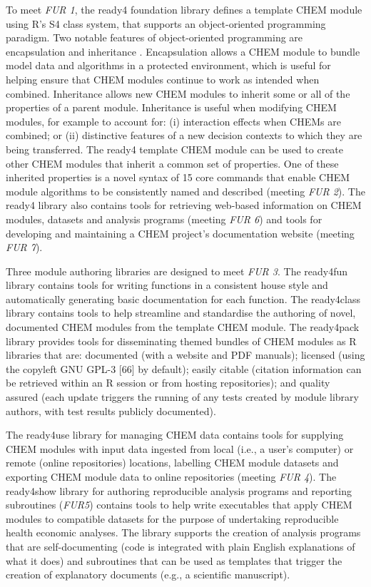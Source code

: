 \documentclass[sn-vancouver,Numbered,pdflatex]{sn-jnl}
\theoremstyle{remark}
\theoremstyle{definition}
\begin{document}
To meet \emph{FUR 1}, the ready4 \citep{ready4lib24} foundation library defines a template CHEM module using R's S4 class system, that supports an object-oriented programming paradigm. Two notable features of object-oriented programming are encapsulation \citep{8717448} and inheritance \citep{8717448}. Encapsulation allows a CHEM module to bundle model data and algorithms in a protected environment, which is useful for helping ensure that CHEM modules continue to work as intended when combined. Inheritance allows new CHEM modules to inherit some or all of the properties of a parent module. Inheritance is useful when modifying CHEM modules, for example to account for: (i) interaction effects when CHEMs are combined; or (ii) distinctive features of a new decision contexts to which they are being transferred. The ready4 template CHEM module can be used to create other CHEM modules that inherit a common set of properties. One of these inherited properties is a novel syntax of 15 core commands that enable CHEM module algorithms to be consistently named and described (meeting \emph{FUR 2}). The ready4 library also contains tools for retrieving web-based information on CHEM modules, datasets and analysis programs (meeting \emph{FUR 6}) and tools for developing and maintaining a CHEM project's documentation website (meeting \emph{FUR 7}).

Three module authoring libraries are designed to meet \emph{FUR 3}. The ready4fun \citep{ready4funlib24} library contains tools for writing functions in a consistent house style and automatically generating basic documentation for each function. The ready4class \citep{ready4classlib24} library contains tools to help streamline and standardise the authoring of novel, documented CHEM modules from the template CHEM module. The ready4pack \citep{ready4packlib24} library provides tools for disseminating themed bundles of CHEM modules as R libraries that are: documented (with a website and PDF manuals); licensed (using the copyleft GNU GPL-3 {[}66{]} by default); easily citable (citation information can be retrieved within an R session or from hosting repositories); and quality assured (each update triggers the running of any tests created by module library authors, with test results publicly documented).

The ready4use \citep{ready4uselib24} library for managing CHEM data contains tools for supplying CHEM modules with input data ingested from local (i.e., a user's computer) or remote (online repositories) locations, labelling CHEM module datasets and exporting CHEM module data to online repositories (meeting \emph{FUR 4}). The ready4show \citep{ready4showlib24} library for authoring reproducible analysis programs and reporting subroutines (\emph{FUR5}) contains tools to help write executables that apply CHEM modules to compatible datasets for the purpose of undertaking reproducible health economic analyses. The library supports the creation of analysis programs that are self-documenting (code is integrated with plain English explanations of what it does) and subroutines that can be used as templates that trigger the creation of explanatory documents (e.g., a scientific manuscript).
\end{document}
